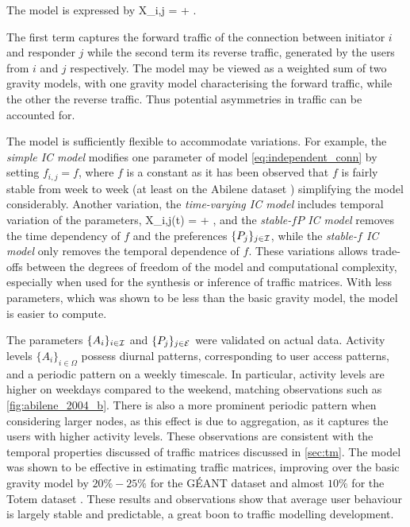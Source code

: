 The model is expressed by
\be
X_{i,j} =  
+ .
\label{eq:independent_conn}
\ee

\noindent The first term captures the forward traffic of the
connection between initiator $i$ and responder $j$ while the second
term its reverse traffic, generated by the users from $i$ and $j$
respectively. The model may be viewed as a weighted sum of two gravity
models, with one gravity model characterising the forward traffic,
while the other the reverse traffic. Thus potential asymmetries in
traffic can be accounted for.

The model is sufficiently flexible to accommodate variations. For example, the \emph{simple IC model} modifies one parameter of 
model \autoref{eq:independent_conn} by setting $f_{i,j} = f$, where $f$ is a constant as it has been observed that $f$ is fairly 
stable 
from week to week (at least on the Abilene dataset \cite{Erramilli06IndepConnTech}) simplifying the model considerably. Another 
variation, the \emph{time-varying IC model} includes temporal variation of the parameters, \ie
\ben
X_{i,j}(t) =  + ,
\een
and the \emph{stable-$fP$ IC model} removes the time dependency of $f$ and the preferences $\{P_j\}_{j \in \mathcal{I}}$, while 
the \emph{stable-$f$ IC model} only removes the temporal dependence of $f$. These variations allows trade-offs between the 
degrees of freedom of the model and computational complexity, especially when used for the synthesis or inference of traffic 
matrices. With less parameters, which was shown to be less than the basic gravity model, the model is easier to compute.

The parameters $\{A_i\}_{i\in\mathcal{I}}$ and $\{P_j\}_{j\in\mathcal{E}}$ were validated on actual data. Activity levels $\{A_i\}_{i\in\Omega}$ 
possess diurnal patterns, corresponding to user access patterns, and a periodic pattern on a weekly timescale. In particular, 
activity levels are higher on weekdays compared to the weekend, matching observations such as \autoref{fig:abilene_2004_b}. There is 
also a more prominent periodic pattern when considering larger nodes, as this effect is due to aggregation,
as it captures the users with higher activity levels. These observations are consistent with the temporal properties 
discussed of traffic matrices discussed in \autoref{sec:tm}. The model was shown to be effective in estimating
traffic matrices, improving over the basic gravity model by $20\%  -25\%$ for the G\'{E}ANT dataset \cite{GEANT} 
and almost $10\%$ for the Totem dataset \cite{Erramilli06IndepConn,Erramilli06IndepConnTech}. 
These results and observations show that average user behaviour is largely stable and predictable, a great boon to traffic 
modelling development.

